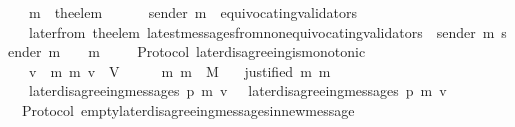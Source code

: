\begin{isabellebody}
\ \ {\isasymlongrightarrow}\ m{\isacharprime}\ {\isacharequal}\ the{\isacharunderscore}elem\ {\isacharparenleft}{\isasymsigma}{\isacharprime}\ {\isacharminus}\ {\isasymsigma}{\isacharparenright}\isanewline
\ \ {\isasymlongrightarrow}\ sender\ m{\isacharprime}\ {\isasymnotin}\ equivocating{\isacharunderscore}validators\ {\isasymsigma}{\isacharprime}\isanewline
\ \ {\isasymlongrightarrow}\ later{\isacharunderscore}from\ {\isacharparenleft}the{\isacharunderscore}elem\ {\isacharparenleft}latest{\isacharunderscore}messages{\isacharunderscore}from{\isacharunderscore}non{\isacharunderscore}equivocating{\isacharunderscore}validators\ {\isasymsigma}\ {\isacharparenleft}sender\ m{\isacharprime}{\isacharparenright}{\isacharparenright}{\isacharcomma}\ sender\ m{\isacharprime}{\isacharcomma}\ {\isasymsigma}{\isacharprime}{\isacharparenright}\ {\isacharequal}\ \ {\isacharbraceleft}m{\isacharprime}{\isacharbraceright}{\isachardoublequoteclose}\isanewline
%
\isadelimproof
\ \ %
\endisadelimproof
%
\isatagproof
{}\isamarkupfalse%
%
\endisatagproof
{\isafoldproof}%
%
\isadelimproof
\isanewline
%
\endisadelimproof
\isanewline
\isanewline
{}\isamarkupfalse%
\ {\isacharparenleft}\ Protocol{\isacharparenright}\ later{\isacharunderscore}disagreeing{\isacharunderscore}is{\isacharunderscore}monotonic{\isacharcolon}\isanewline
\ \ {\isachardoublequoteopen}{\isasymforall}\ v\ {\isasymsigma}\ m{}\ m{}{\isachardot}\ v\ {\isasymin}\ V\ {\isasymand}\ {\isasymsigma}\ {\isasymin}\ {\isasymSigma}\ {\isasymand}\ {\isacharbraceleft}m{}{\isacharcomma}\ m{}{\isacharbraceright}\ {\isasymsubseteq}\ M\isanewline
\ \ {\isasymlongrightarrow}\ justified\ m{}\ m{}\isanewline
\ \ {\isasymlongrightarrow}\ later{\isacharunderscore}disagreeing{\isacharunderscore}messages\ {\isacharparenleft}p{\isacharcomma}\ m{}{\isacharcomma}\ v{\isacharcomma}\ {\isasymsigma}{\isacharparenright}\ {\isasymsubseteq}\ later{\isacharunderscore}disagreeing{\isacharunderscore}messages\ {\isacharparenleft}p{\isacharcomma}\ m{}{\isacharcomma}\ v{\isacharcomma}\ {\isasymsigma}{\isacharparenright}{\isachardoublequoteclose}\isanewline
%
\isadelimproof
\ \ %
\endisadelimproof
%
\isatagproof
{}\isamarkupfalse%
%
\endisatagproof
{\isafoldproof}%
%
\isadelimproof
\isanewline
%
\endisadelimproof
\isanewline
\isanewline
{}\isamarkupfalse%
\ {\isacharparenleft}\ Protocol{\isacharparenright}\ empty{\isacharunderscore}later{\isacharunderscore}disagreeing{\isacharunderscore}messages{\isacharunderscore}in{\isacharunderscore}new{\isacharunderscore}message\ {\isacharcolon}\isanewline

\end{isabellebody}
